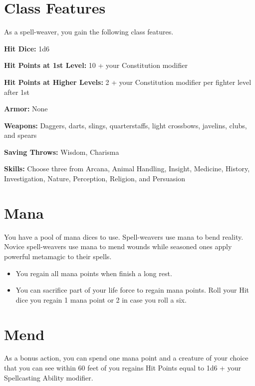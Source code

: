 \begin{multicols*}{2}

\section*{Class Features} 

As a spell-weaver, you gain the following class features.

\textbf{Hit Dice:} 1d6

\textbf{Hit Points at 1st Level:} 10 + your Constitution modifier

\textbf{Hit Points at Higher Levels:} 2 + your Constitution modifier per fighter level after 1st


\textbf{Armor:} None

\textbf{Weapons:} Daggers, darts, slings, quarterstaffs, light crossbows, javelins, clubs, and spears

\textbf{Saving Throws:} Wisdom, Charisma

\textbf{Skills:} Choose three from Arcana, Animal Handling, Insight, Medicine, History, Investigation, Nature, Perception, Religion, and Persuasion
    
\section*{Mana} 

You have a pool of mana dices to use. Spell-weavers use mana to bend reality. Novice spell-weavers use mana to mend wounds while seasoned ones apply powerful metamagic to their spells.



\begin{itemize}
    \item You regain all mana points when finish a long rest.
    \item You can sacrifice part of your life force to regain mana points. Roll your Hit dice you regain 1 mana point or 2 in case you roll a six.
\end{itemize}


    
\section*{Mend} 

As a bonus action, you can spend one mana point and a creature of your choice that you can see within 60 feet of you regains Hit Points equal to 1d6 + your Spellcasting Ability modifier.




\end{multicols*}
